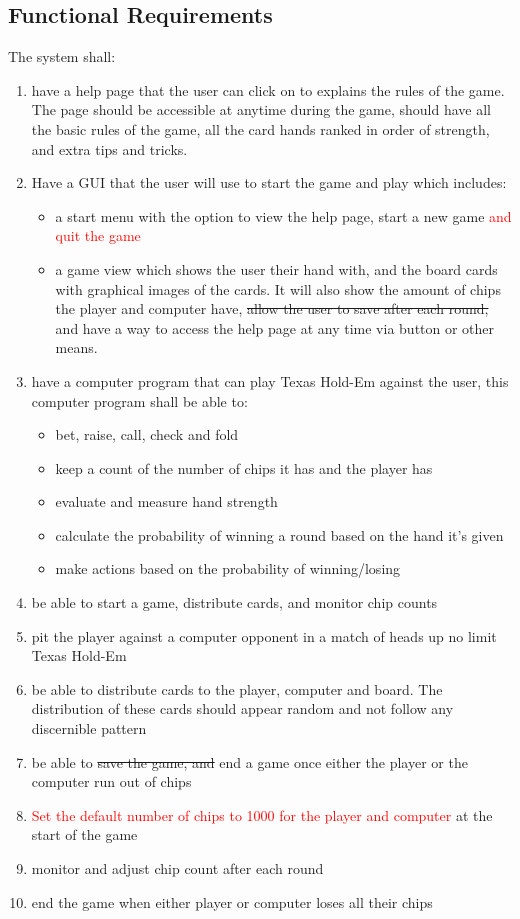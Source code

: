 \documentclass[12pt]{article}
\begin{document}
	\subsection{Functional Requirements}
	The system shall:
	\begin{enumerate}
	\item have a help page that the user can click on to explains the rules of the game. The page should be accessible at anytime during the game, should have all the basic rules of the game, all the card hands ranked in order of strength, and extra tips and tricks.
	\item Have a GUI that the user will use to start the game and play which includes:
	\begin{itemize}
	\item a start menu with the option to view the help page, start a new game \textcolor{red}{and quit the game}
	\item a game view which shows the user their hand with, and the board cards with graphical images of the cards. It will also show the amount of chips the player and computer have, \sout{allow the user to save after each round,} and have a way to access the help page at any time via button or other means. 
	\end{itemize}
	\item have a computer program that can play Texas Hold-Em against the user, this computer program shall be able to:
	\begin{itemize}
	\item bet, raise, call, check and fold
	\item 	keep a count of the number of chips it has and the player has
	\item 	evaluate and measure hand strength
	\item	calculate the probability of winning a round based on the hand it’s given
	\item 	make actions based on the probability of winning/losing
	\end{itemize}
	\item be able to start a game, distribute cards, and monitor chip counts
	\item pit the player against a computer opponent in a match of heads up no limit 					Texas Hold-Em
	\item be able to distribute cards to the player, computer and board. The distribution of these cards should appear random and not follow any discernible pattern
	\item be able to \sout{save the game, and} end a game once either the player or the computer run out of chips
	\item \textcolor{red}{Set the default number of chips to 1000 for the player and computer} at the start of the game
	\item monitor and adjust chip count after each round
	\item end the game when either player or computer loses all their chips
	\end{enumerate}
	
\end{document}
